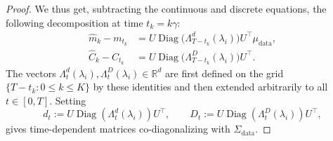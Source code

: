 \documentclass[11pt]{article}
\begin{document}
\begin{proof}
    We thus get, subtracting the continuous and discrete equations, the following decomposition at time $t_k = k \gamma$:
\begin{align*}
\hat m_k-m_{t_k}
  &=  U \operatorname{Diag}\Big( \Lambda_{T- t_k}^d(\lambda_i)\Big) U^\top \mu_{\mathrm{data}},\\
\hat C_k - C_{t_k}
 &= U \operatorname{Diag}\Big( \Lambda_{T- t_k}^D(\lambda_i)\Big) U^\top .
\end{align*}
The vectors $\Lambda_t^d(\lambda_i),\Lambda_t^D(\lambda_i)\in\mathbb R^d$ are first defined on the grid
$\{T-t_k:0\leq k\leq K\}$ by these identities and then extended arbitrarily to
all $t\in[0,T]$. Setting
\[
d_t:=U\operatorname{Diag}(\Lambda_t^d(\lambda_i))U^\top,
\qquad
D_t:=U\operatorname{Diag}(\Lambda_t^D(\lambda_i))U^\top,
\]
gives time-dependent matrices co-diagonalizing with $\Sigma_{\mathrm{data}}$.
\end{proof}
\end{document}
